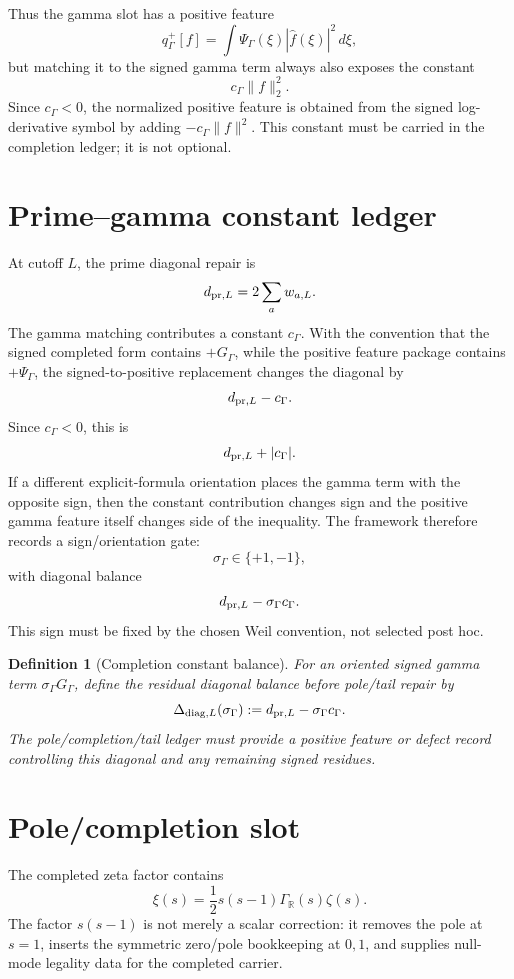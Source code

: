 \documentclass[11pt]{article}
\newtheorem{definition}{Definition}
\begin{document}
Thus the gamma slot has a positive feature
\[
  q^+_\Gamma[f]=\int \Psi_\Gamma(\xi)|\widehat f(\xi)|^2\,d\xi,
\]
but matching it to the signed gamma term always also exposes the constant
\[
  c_\Gamma\|f\|_2^2.
\]
Since \(c_\Gamma<0\), the normalized positive feature is obtained from the signed log-derivative symbol by adding \(-c_\Gamma\|f\|^2\).  This constant must be carried in the completion ledger; it is not optional.

\section{Prime--gamma constant ledger}
At cutoff \(L\), the prime diagonal repair is
\[
  d_{{\rm pr},L}=2\sum_a w_{a,L}.
\]
The gamma matching contributes a constant \(c_\Gamma\).  With the convention that the signed completed form contains \(+G_\Gamma\), while the positive feature package contains \(+\Psi_\Gamma\), the signed-to-positive replacement changes the diagonal by
\[
  d_{{\rm pr},L}-c_\Gamma.
\]
Since \(c_\Gamma<0\), this is
\[
  d_{{\rm pr},L}+|c_\Gamma|.
\]
If a different explicit-formula orientation places the gamma term with the opposite sign, then the constant contribution changes sign and the positive gamma feature itself changes side of the inequality.  The framework therefore records a sign/orientation gate:
\[
  \sigma_\Gamma\in\{+1,-1\},
\]
with diagonal balance
\[
  d_{{\rm pr},L}-\sigma_\Gamma c_\Gamma.
\]
This sign must be fixed by the chosen Weil convention, not selected post hoc.

\begin{definition}[Completion constant balance]
For an oriented signed gamma term \(\sigma_\Gamma G_\Gamma\), define the residual diagonal balance before pole/tail repair by
\[
  \Delta_{{\rm diag},L}(\sigma_\Gamma)
  :=d_{{\rm pr},L}-\sigma_\Gamma c_\Gamma.
\]
The pole/completion/tail ledger must provide a positive feature or defect record controlling this diagonal and any remaining signed residues.
\end{definition}

\section{Pole/completion slot}
The completed zeta factor contains
\[
  \xi(s)=\frac12s(s-1)\Gamma_{\mathbb R}(s)\zeta(s).
\]
The factor \(s(s-1)\) is not merely a scalar correction: it removes the pole at \(s=1\), inserts the symmetric zero/pole bookkeeping at \(0,1\), and supplies null-mode legality data for the completed carrier.
\end{document}
